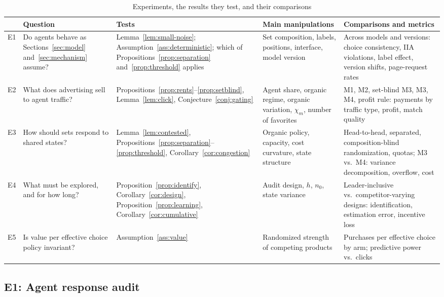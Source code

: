 \documentclass[opre,dblanonrev]{informs4}
\providecommand{\1}{\mathbf{1}}
\begin{document}
\begin{table}[htbp]
\centering\small
\caption{Experiments, the results they test, and their comparisons}\label{tab:exp-overview}
\begin{tabularx}{\textwidth}{@{}>{\raggedright\arraybackslash}p{}>{\raggedright\arraybackslash}X>{\raggedright\arraybackslash}p{}>{\raggedright\arraybackslash}X>{\raggedright\arraybackslash}X@{}}
\toprule
& Question & Tests & Main manipulations & Comparisons and metrics \\
\midrule
E1 & Do agents behave as Sections~\ref{sec:model} and~\ref{sec:mechanism} assume? & Lemma~\ref{lem:small-noise}; Assumption~\ref{ass:deterministic}; which of Propositions~\ref{prop:separation} and~\ref{prop:threshold} applies & Set composition, labels, positions, interface, model version & Across models and versions: choice consistency, IIA violations, label effect, version shifts, page-request rates \\
E2 & What does advertising sell to agent traffic? & Propositions~\ref{prop:rents}--\ref{prop:setblind}, Lemma~\ref{lem:click}, Conjecture~\ref{conj:gating} & Agent share, organic regime, organic variation, $\chi_m$, number of favorites & M1, M2, set-blind M3, M3, M4, profit rule: payments by traffic type, profit, match quality \\
E3 & How should sets respond to shared states? & Lemma~\ref{lem:contested}, Propositions~\ref{prop:separation}--\ref{prop:threshold}, Corollary~\ref{cor:congestion} & Organic policy, capacity, cost curvature, state structure & Head-to-head, separated, composition-blind randomization, quotas; M3 vs.\ M4: variance decomposition, overflow, cost \\
E4 & What must be explored, and for how long? & Proposition~\ref{prop:identify}, Corollary~\ref{cor:design}, Proposition~\ref{prop:learning}, Corollary~\ref{cor:cumulative} & Audit design, $h$, $n_0$, state variance & Leader-inclusive vs.\ competitor-varying designs: identification, estimation error, incentive loss \\
E5 & Is value per effective choice policy invariant? & Assumption~\ref{ass:value} & Randomized strength of competing products & Purchases per effective choice by arm; predictive power vs.\ clicks \\
\bottomrule
\end{tabularx}
\end{table}

\subsection{E1: Agent response audit}\label{sec:exp-audit}
\end{document}
